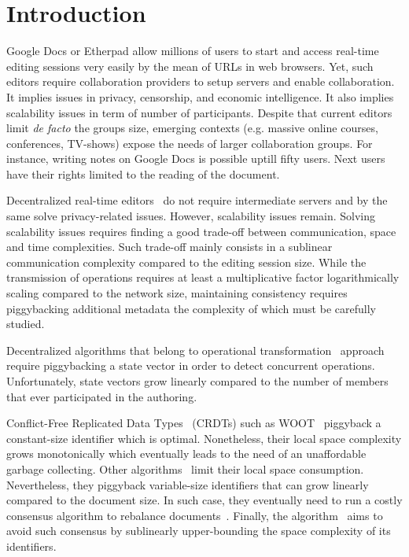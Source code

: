 
\section{Introduction}

Google Docs or Etherpad allow millions of users to start and access real-time
editing sessions very easily by the mean of URLs in web browsers. Yet, such
editors require collaboration providers to setup servers and enable
collaboration. It implies issues in privacy, censorship, and economic
intelligence. It also implies scalability issues in term of number of
participants. Despite that current editors limit \emph{de facto} the groups
size, emerging contexts (e.g. massive online courses, conferences, TV-shows)
expose the needs of larger collaboration groups.  For instance, writing notes on
Google Docs is possible uptill fifty users. Next users have their rights limited
to the reading of the document.

Decentralized real-time editors~\cite{oster2006data, sun1998operational,
  sun2009contextbased} do not require intermediate servers and by the same solve
privacy-related issues. However, scalability issues remain.  Solving scalability
issues requires finding a good trade-off between communication, space and time
complexities. Such trade-off mainly consists in a sublinear communication
complexity compared to the editing session size. While the transmission of
operations requires at least a multiplicative factor logarithmically scaling
compared to the network size, maintaining consistency requires piggybacking
additional metadata the complexity of which must be carefully studied.

Decentralized algorithms that belong to operational
transformation~\cite{sun2009contextbased} approach require piggybacking a state
vector in order to detect concurrent operations. Unfortunately, state vectors
grow linearly compared to the number of members that ever participated in the
authoring.

Conflict-Free Replicated Data Types~\cite{shapiro2011comprehensive} (CRDTs) such
as WOOT~\cite{oster2006data} piggyback a constant-size identifier which is
optimal. Nonetheless, their local space complexity grows monotonically which
eventually leads to the need of an unaffordable garbage collecting. Other
algorithms~\cite{preguica2009commutative, weiss2010logootundo} limit their local
space consumption. Nevertheless, they piggyback variable-size identifiers that
can grow linearly compared to the document size. In such case, they eventually
need to run a costly consensus algorithm to rebalance
documents~\cite{zawirski2011asynchronous}. Finally, the \LSEQ
algorithm~\cite{nedelec2013concurrency} aims to avoid such consensus by
sublinearly upper-bounding the space complexity of its identifiers. 

